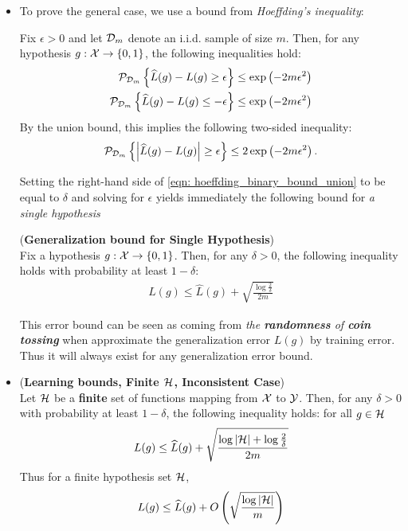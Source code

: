 \documentclass[11pt]{article}
\begin{document}
\begin{itemize}
\item To prove the general case, we use a bound from \emph{Hoeffding's inequality}:
\begin{proposition}
Fix $\epsilon > 0$ and let ${\mathcal D}_{m}$ denote an i.i.d. sample of size $m$. Then, for any hypothesis $g: {\mathcal X} \to \left\{0, 1\right\}$, the following inequalities hold:
\begin{align}
{\mathcal P}_{{\mathcal D}_m}\left\{\widehat{L}(g)  - L(g) \ge \epsilon\right\} \le \exp\left(-2m\epsilon^2\right) \label{eqn: hoeffding_binary_bound_1}\\
{\mathcal P}_{{\mathcal D}_m}\left\{\widehat{L}(g)  - L(g) \le -\epsilon\right\} \le \exp\left(-2m\epsilon^2\right) \label{eqn: hoeffding_binary_bound_2}
\end{align}
By the union bound, this implies the following two-sided inequality:
\begin{align}
{\mathcal P}_{{\mathcal D}_m}\left\{\left\lvert \widehat{L}(g)  - L(g) \right\rvert \ge \epsilon\right\} \le 2\exp\left(-2m\epsilon^2\right). \label{eqn: hoeffding_binary_bound_union}
\end{align}
\end{proposition}
Setting the right-hand side of \eqref{eqn: hoeffding_binary_bound_union} to be equal to $\delta$ and solving for $\epsilon$ yields immediately the following bound for \emph{a single hypothesis}

\begin{corollary} (\textbf{Generalization bound for Single Hypothesis})  \citep{mohri2018foundations}\\
Fix a hypothesis $g: {\mathcal X} \to \left\{0, 1\right\}$. Then, for any $\delta > 0$, the following inequality holds with probability at least $1 - \delta$:
\begin{align}
 L(g) \le  \widehat{L}(g) + \sqrt{\frac{\log\frac{2}{\delta}}{2m}}  \label{eqn: pac_one_hypothesis}
\end{align}
\end{corollary} This error bound can be seen as coming from \emph{the \textbf{randomness} of \textbf{coin tossing}} when approximate the generalization error $L(g)$ by training error. Thus it will always exist for any generalization error bound. 

\item \begin{proposition} (\textbf{Learning bounds, Finite ${\mathcal H}$, Inconsistent Case}) \citep{mohri2018foundations}\\
Let ${\mathcal H}$ be a \textbf{finite} set of functions mapping from ${\mathcal X}$ to ${\mathcal Y}$.  Then, for any $\delta > 0$ with probability at least $1 - \delta$, the following inequality holds: for all $g \in {\mathcal H}$
\begin{align}
 L(g) \le  \widehat{L}(g) + \sqrt{\frac{\log\left\lvert {\mathcal H} \right\rvert + \log\frac{2}{\delta}}{2m}}  \label{eqn: pac_finite_case_consistency}
\end{align} Thus for a finite hypothesis set ${\mathcal H}$, 
\begin{align}
 L(g) \le  \widehat{L}(g) + O\left(\sqrt{\frac{\log\left\lvert {\mathcal H} \right\rvert}{m}}\right)  \label{eqn: pac_finite_case_consistency_bigO}
\end{align}
\end{proposition}


\end{itemize}
\end{document}
